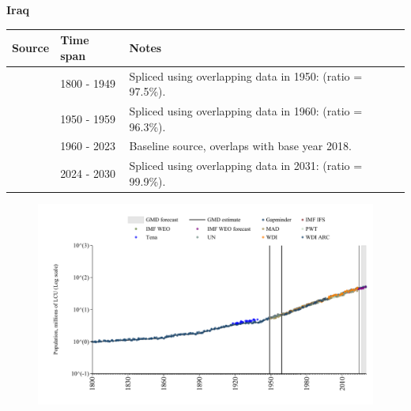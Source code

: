 \documentclass[12pt,a4paper,landscape]{article}
\begin{document}
\begin{adjustbox}{max totalsize={\paperwidth}{\paperheight},center}
\begin{minipage}[t][\textheight][t]{\textwidth}
\vspace*{0.5cm}
{}
\begin{center}
{\Large\bfseries Iraq}
\end{center}
\vspace{0.5cm}
\begin{table}[H]
\centering
\small
\begin{tabular}{|l|l|l|}
\hline
\textbf{Source} & \textbf{Time span} & \textbf{Notes} \\
\hline
\rowcolor{white}\cite{Gapminder}& 1800 - 1949 &Spliced using overlapping data in 1950: (ratio = 97.5\%).\\
\rowcolor{lightgray}\cite{IMF_IFS}& 1950 - 1959 &Spliced using overlapping data in 1960: (ratio = 96.3\%).\\
\rowcolor{white}\cite{WDI}& 1960 - 2023 &Baseline source, overlaps with base year 2018.\\
\rowcolor{lightgray}\cite{Gapminder}& 2024 - 2030 &Spliced using overlapping data in 2031: (ratio = 99.9\%).\\
\hline
\end{tabular}
\end{table}
\begin{figure}[H]
\centering
\includegraphics[width=\textwidth,height=0.6\textheight,keepaspectratio]{graphs/IRQ_pop.pdf}
\end{figure}
\end{minipage}
\end{adjustbox}
\end{document}
